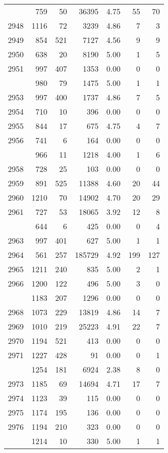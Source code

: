 \documentclass[
]{article}
\begin{document}
\begin{table}
\begin{tabular}[t]{lrrrrrr}
\addlinespace
2947 & 759 & 50 & 36395 & 4.75 & 55 & 70\\
2948 & 1116 & 72 & 3239 & 4.86 & 7 & 3\\
2949 & 854 & 521 & 7127 & 4.56 & 9 & 9\\
2950 & 638 & 20 & 8190 & 5.00 & 1 & 5\\
2951 & 997 & 407 & 1353 & 0.00 & 0 & 0\\
\addlinespace
2952 & 980 & 79 & 1475 & 5.00 & 1 & 1\\
2953 & 997 & 400 & 1737 & 4.86 & 7 & 5\\
2954 & 710 & 10 & 396 & 0.00 & 0 & 0\\
2955 & 844 & 17 & 675 & 4.75 & 4 & 7\\
2956 & 741 & 6 & 164 & 0.00 & 0 & 0\\
\addlinespace
2957 & 966 & 11 & 1218 & 4.00 & 1 & 6\\
2958 & 728 & 25 & 103 & 0.00 & 0 & 0\\
2959 & 891 & 525 & 11388 & 4.60 & 20 & 44\\
2960 & 1210 & 70 & 14902 & 4.70 & 20 & 29\\
2961 & 727 & 53 & 18065 & 3.92 & 12 & 8\\
\addlinespace
2962 & 644 & 6 & 425 & 0.00 & 0 & 4\\
2963 & 997 & 401 & 627 & 5.00 & 1 & 1\\
2964 & 561 & 257 & 185729 & 4.92 & 199 & 127\\
2965 & 1211 & 240 & 835 & 5.00 & 2 & 1\\
2966 & 1200 & 122 & 496 & 5.00 & 3 & 0\\
\addlinespace
2967 & 1183 & 207 & 1296 & 0.00 & 0 & 0\\
2968 & 1073 & 229 & 13819 & 4.86 & 14 & 7\\
2969 & 1010 & 219 & 25223 & 4.91 & 22 & 7\\
2970 & 1194 & 521 & 413 & 0.00 & 0 & 0\\
2971 & 1227 & 428 & 91 & 0.00 & 0 & 1\\
\addlinespace
2972 & 1254 & 181 & 6924 & 2.38 & 8 & 0\\
2973 & 1185 & 69 & 14694 & 4.71 & 17 & 7\\
2974 & 1123 & 39 & 115 & 0.00 & 0 & 0\\
2975 & 1174 & 195 & 136 & 0.00 & 0 & 0\\
2976 & 1194 & 210 & 323 & 0.00 & 0 & 0\\
\addlinespace
2977 & 1214 & 10 & 330 & 5.00 & 1 & 1\\

\end{tabular}
\end{table}
\end{document}
